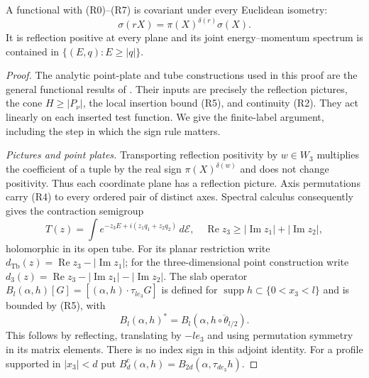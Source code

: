 \documentclass[11pt,letterpaper,reqno]{amsart}
\makeatletter
\theoremstyle{definition}
\newcommand{\ms@majorstart}{%
  \pushQED{\qed}\renewcommand{\qedsymbol}{$\blacksquare\square$}}
\newenvironment{theorem}[1][]{\ms@majorstart\ms@theorem[#1]}
  {\popQED\endms@theorem}
\theoremstyle{remark}
\makeatother
\begin{document}
\begin{theorem}[Finite-family rotation criterion]\label{C-389-30}
A functional with (R0)--(R7) is covariant under every
Euclidean isometry:
\[
 \sigma(rX)=\pi(X)^{\delta(r)}\sigma(X).
\]
It is reflection positive at every plane and its joint
energy--momentum spectrum is contained in
$\{(E,q):E\ge|q|\}$.
\end{theorem}

\begin{proof}
The analytic point-plate and tube constructions used in
this proof are the general functional results of
\cite[Propositions 97.1, 97.2 and the kernel
construction preceding 98.2]{YMM1}.  Their inputs
are precisely the reflection pictures, the cone
$H\ge|P_\nu|$, the local insertion bound (R5), and
continuity (R2).  They act linearly on each inserted
test function.  We give the finite-label argument,
including the step in which the sign rule matters.

\emph{Pictures and point plates.}
Transporting reflection positivity by $w\in W_3$
multiplies the coefficient of a tuple by the real sign
$\pi(X)^{\delta(w)}$ and does not change positivity.
Thus each coordinate plane has a reflection picture.
Axis permutations carry (R4) to every ordered pair of
distinct axes.  Spectral calculus consequently gives
the contraction semigroup
\[
 T(z)=\int e^{-z_3E+i(z_1q_1+z_2q_2)}\,d\mathscr E,
 \quad \operatorname{Re}z_3\ge
               |\operatorname{Im}z_1|+|\operatorname{Im}z_2|,
\]
holomorphic in its open tube.
For its planar restriction write
$d_{\mathrm{Tb}}(z)=\operatorname{Re}z_3-
|\operatorname{Im}z_1|$; for the three-dimensional
point construction write
$d_3(z)=\operatorname{Re}z_3-
|\operatorname{Im}z_1|-|\operatorname{Im}z_2|$.
The slab operator
$B_l(\alpha,h)[G]=[(\alpha,h)\cdot\tau_{le_3}G]$
is defined for $\operatorname{supp}h\subset\{0<x_3<l\}$
and is bounded by (R5), with
\[
 B_l(\alpha,h)^*=B_l(\alpha,\overline{h\circ\theta_{l/2}}).
\]
This follows by reflecting, translating by $-le_3$ and
using permutation symmetry in its matrix elements.
There is no index sign in this adjoint identity.
For a profile supported in $|x_3|<d$ put
$B_d^{\mathrm c}(\alpha,h)=
B_{2d}(\alpha,\tau_{de_3}h)$.


\end{proof}
\end{document}
